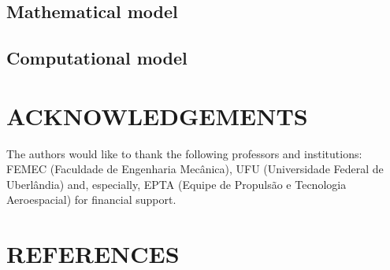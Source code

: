 \documentclass[10pt,fleqn,a4paper,twoside]{article}
\begin{document}
\subsection{Mathematical model}

\subsection{Computational model}


\section{ACKNOWLEDGEMENTS}

The authors would like to thank the following professors and institutions: FEMEC (Faculdade de Engenharia Mecânica), UFU (Universidade Federal de Uberlândia) and, especially, EPTA (Equipe de Propulsão e Tecnologia Aeroespacial) for financial support.




\section{REFERENCES} 


\renewcommand{\refname}{}

\end{document}
